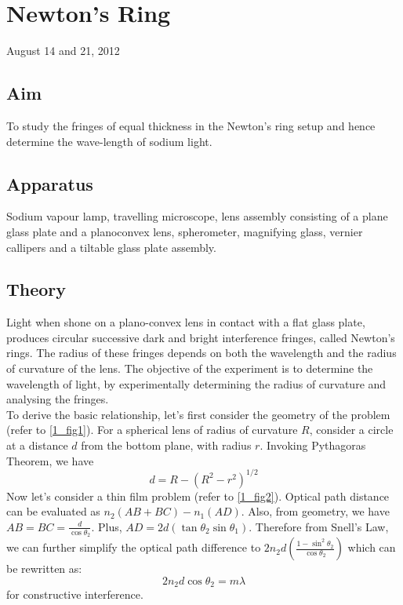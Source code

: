 \chapter{Newton's Ring}
\begin{flushright}
August 14 and 21, 2012
\end{flushright}
\section{Aim}
	To study the fringes of equal thickness in the Newton's ring setup and hence determine the wave-length of sodium light.
\section{Apparatus}
	Sodium vapour lamp, travelling microscope, lens assembly consisting of a plane glass plate and a planoconvex lens, spherometer, magnifying glass, vernier callipers and a tiltable  glass plate assembly.

\section{Theory}
	Light when shone on a plano-convex lens in contact with a flat glass plate, produces circular successive dark and bright interference fringes, called Newton's rings. The radius of these fringes depends on both the wavelength and the radius of curvature of the lens. The objective of the experiment is to determine the wavelength of light, by experimentally determining the radius of curvature and analysing the fringes.\\
	To derive the basic relationship, let's first consider the geometry of the problem (refer to \autoref{1_fig1}). For a spherical lens of radius of curvature $R$, consider a circle at a distance $d$ from the bottom plane, with radius $r$. Invoking Pythagoras Theorem, we have
	\begin{equation}
		d=R- (R^{2} - r^{2})^{1/2}
	\end{equation}
	Now let's consider a thin film problem (refer to \autoref{1_fig2}). Optical path distance can be evaluated as $n_{2}(AB + BC) - n_{1}(AD)$. Also, from geometry, we have $AB=BC=\frac{d}{\cos{\theta _{2}}}$. Plus, $AD=2d(\tan{\theta_{2}}\sin{\theta_{1}})$. Therefore from Snell's Law, we can further simplify the optical path difference to $2n_{2}d(\frac{1-\sin^{2}{\theta_{2}}}{\cos{\theta_{2}}})$ which can be rewritten as:
	\begin{equation}	
		2n_{2}d\cos{\theta_{2}}=m\lambda
	\end{equation}
	for constructive interference. \\

